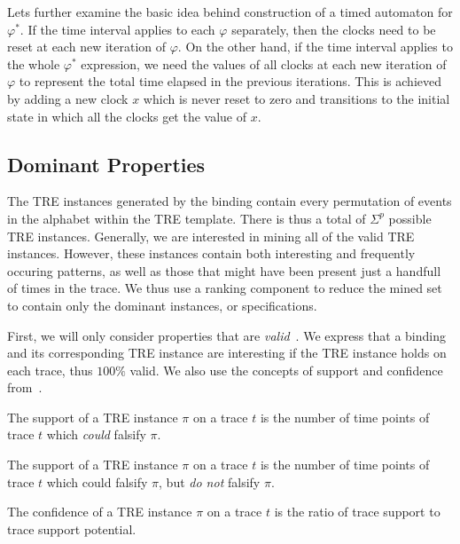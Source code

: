 \documentclass[]{sigplanconf}
\begin{document}
Lets further examine the basic idea behind construction of a timed automaton for $\varphi^*$. If the time interval applies to each $\varphi$ separately, then the clocks need to be reset at each new iteration of $\varphi$. On the other hand, if the time interval applies to the whole $\varphi^*$ expression, we need the values of all clocks at each new iteration of $\varphi$ to represent the total time elapsed in the previous iterations. This is achieved by adding a new clock $x$ which is never reset to zero and transitions to the initial state in which all the clocks get the value of $x$.


\subsection{Dominant Properties}

The TRE instances generated by the binding contain every permutation of events in the alphabet within the TRE template. There is thus a total of $\Sigma^p$ possible TRE instances. Generally, we are interested in mining all of the valid TRE instances.
However, these instances contain both interesting and frequently occuring patterns, as well as those that might have been present just a handfull of times in the trace. We thus use a ranking component to reduce the mined set to contain only the dominant instances, or specifications.

First, we will only consider properties that are \emph{valid}~\cite{lemieux2015general}. We express that a binding and its corresponding TRE instance are interesting if the TRE instance holds on each trace, thus $100 \%$ valid. We also use the concepts of support and confidence from~\cite{lemieux2015general}.

\begin{defns}
The support of a TRE instance $\pi$ on a trace $t$ is the number of time points of trace $t$ which \emph{could} falsify $\pi$.
\end{defns}

\begin{defns}[Support]
The support of a TRE instance $\pi$ on a trace $t$ is the number of time points of trace $t$ which could falsify $\pi$, but \emph{do not} falsify $\pi$.
\end{defns}

\begin{defns}[Confidence]
The confidence of a TRE instance $\pi$ on a trace $t$ is the ratio of trace support to trace support potential.
\end{defns}
\end{document}
